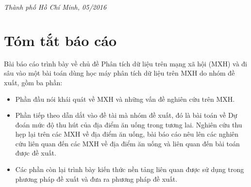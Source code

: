\documentclass[12pt]{extarticle}
\begin{document}
\begin{titlepage}
\large \emph{Thành phố Hồ Chí Minh, 05/2016}


 

\vfill %

\end{titlepage}


	\newpage
	\thispagestyle{empty}
	\tableofcontents
	\newpage
	\listoffigures
	\newpage
	\listoftables
	\newpage
	\section{Tóm tắt báo cáo}	
		\par Bài báo cáo trình bày về chủ đề Phân tích dữ liệu trên mạng xã hội (MXH) và đi sâu vào một bài toán dùng học máy phân tích dữ liệu trên MXH do nhóm đề xuất, gồm ba phần:
		\begin{itemize}

		\item{Phần đầu nói khái quát về MXH và những vấn đề nghiên cứu trên MXH.}	

		\item{Phần tiếp theo dẫn dắt vào đề tài mà nhóm đề xuất, đó là bài toán về Dự đoán mức độ thu hút của địa điểm ăn uống trong tương lai. Nghiên cứu thu hẹp lại trên các MXH về địa điểm ăn uống, bài báo cáo nêu lên các nghiên cứu liên quan đến các MXH về địa điểm ăn uống và liên quan đến bài toán được đề xuất.}

		\item{Các phần còn lại trình bày kiến thức nền tảng liên quan được sử dụng trong phương pháp đề xuất và đưa ra phương pháp đề xuất.}


		\end{itemize}
\end{document}
